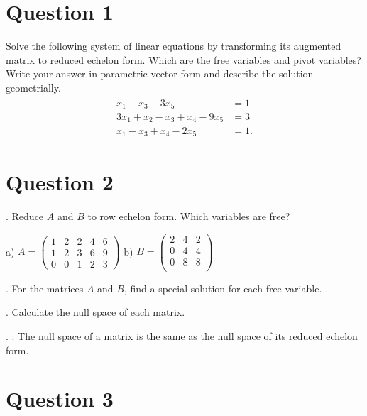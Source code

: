\documentclass[letterpaper,10pt,english]{jupyterBook}
\begin{document}
\section{Question 1}
\label{\detokenize{LinearAlgebra/problems/problems_1:question-1}}


\sphinxAtStartPar
Solve the following system of linear equations by transforming its augmented matrix to reduced echelon form. Which are the free variables and pivot variables? Write your answer in parametric vector form and describe the solution geometrially.
\begin{equation*}
\begin{split}
\begin{align}
x_1 - x_3 - 3x_5 &= 1\\
3x_1 + x_2 - x_3 + x_4 - 9x_5 &= 3\\
x_1 - x_3 + x_4 - 2x_5 &= 1.
\end{align}
\end{split}
\end{equation*}

\section{Question 2}
\label{\detokenize{LinearAlgebra/problems/problems_1:question-2}}


. Reduce \(A\) and \(B\) to row echelon form. Which variables are free?

\sphinxAtStartPar
a) \(A = \begin{pmatrix}
1 & 2 & 2 & 4 & 6\\
1 & 2 & 3 & 6 & 9\\
0 & 0 & 1 & 2 & 3
\end{pmatrix}\)
b) \(B = \begin{pmatrix}
2 & 4 & 2\\
0 & 4 & 4\\
0 & 8 & 8\\
\end{pmatrix}\)

. For the matrices \(A\) and \(B\), find a special solution for each free variable.

. Calculate the null space of each matrix.

. : The null space of a matrix is the same as the null space of its reduced echelon form.


\section{Question 3}
\label{\detokenize{LinearAlgebra/problems/problems_1:question-3}}
\end{document}
